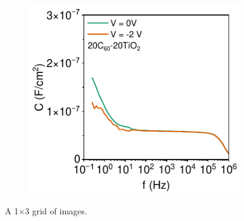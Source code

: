 \begin{figure}[htbp]
\begin{subfigure}{0.32\textwidth}
        \caption{}
        \label{}
    \end{subfigure}
    \hfill
    \begin{subfigure}{0.32\textwidth}
        \centering
        \includegraphics[width=\textwidth]{chapters/transport_layers/images/Cf_20_20.pdf}
        \caption{}
        \label{}
    \end{subfigure}
    
    \caption{A 1×3 grid of images.}
    \label{}
\end{figure}



